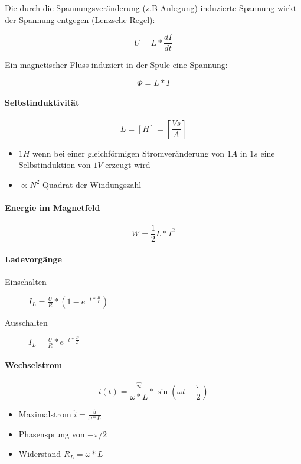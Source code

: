 Die durch die Spannungsveränderung (z.B Anlegung) induzierte Spannung wirkt der Spannung entgegen (Lenzsche Regel):

$$U = L * \frac{dI}{dt}$$

Ein magnetischer Fluss induziert in der Spule eine Spannung:

$$\Phi = L * I$$

\paragraph{Selbstinduktivität}

$$L = [H] = \left[\frac{Vs}{A}\right]$$

\begin{itemize}
  \item $1H$ wenn bei einer gleichförmigen Stromveränderung von $1A$ in $1s$ eine Selbstinduktion von $1V$ erzeugt wird
  \item $\propto N^2$ Quadrat der Windungszahl
\end{itemize}

\paragraph{Energie im Magnetfeld}

$$W = \frac{1}{2} L * I^2$$

\paragraph{Ladevorgänge}

\begin{description}
  \item[Einschalten] $I_L = \frac{U}{R} * (1 - e^{-t * \frac{R}{L}})$
  \item[Ausschalten] $I_L = \frac{U}{R} * e^{-t * \frac{R}{L}}$
\end{description}

\paragraph{Wechselstrom}

$$i(t) = \frac{\hat{u}}{\omega * L} * \sin (\omega t - \frac{\pi}{2})$$

\begin{itemize}
  \item Maximalstrom $\hat{i} = \frac{\hat{u}}{\omega * L}$
  \item Phasensprung von $-\pi/2$
  \item Widerstand $R_L = \omega * L$
\end{itemize}

